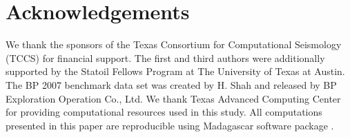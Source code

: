 \section{Acknowledgements}
We thank the sponsors of the Texas Consortium for Computational Seismology (TCCS) for financial support.
The first and third authors were additionally supported by the Statoil Fellows Program at The University of Texas at Austin.
The BP 2007 benchmark data set was created by H. Shah and released by BP Exploration Operation Co., Ltd.
We thank Texas Advanced Computing Center for providing computational resources used in this study.
All computations presented in this paper are reproducible using Madagascar software package \cite[]{fomel13b}.

\onecolumn


